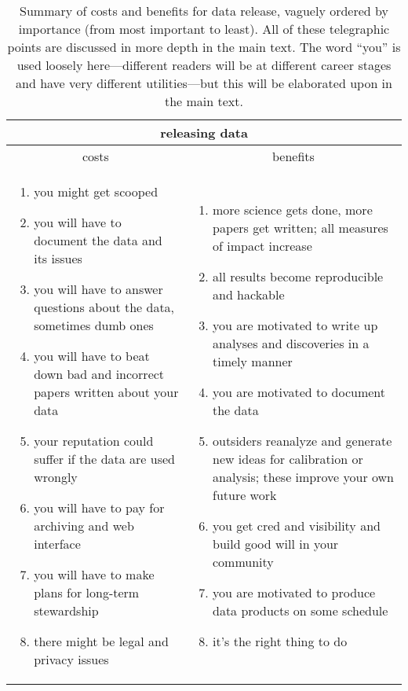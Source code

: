 \documentclass[12pt,twoside,pdftex]{article}
\begin{document}
\newlength{\cwidth}\setlength{\cwidth}{0.483\textwidth}%
\begin{table}%
\begin{tabular}{@{}p{\cwidth}|p{\cwidth}@{}}%
\multicolumn{2}{c}{\textbf{releasing data}} \\ \hline
\multicolumn{1}{c|}{costs} & \multicolumn{1}{c}{benefits} \\ \hline
\begin{enumerate}\raggedright
\item you might get scooped
\item you will have to document the data and its issues
\item you will have to answer questions about the data, sometimes dumb ones
\item you will have to beat down bad and incorrect papers written about your data
\item your reputation could suffer if the data are used wrongly
\item you will have to pay for archiving and web interface
\item you will have to make plans for long-term stewardship
\item there might be legal and privacy issues
\end{enumerate}&\begin{enumerate}\raggedright
\item more science gets done, more papers get written; all measures of impact increase
\item all results become reproducible and hackable
\item you are motivated to write up analyses and discoveries in a timely manner
\item you are motivated to document the data
\item outsiders reanalyze and generate new ideas for calibration or analysis; these improve your own future work
\item you get cred and visibility and build good will in your community
\item you are motivated to produce data products on some schedule
\item it's the right thing to do
\end{enumerate}\end{tabular}
\caption{Summary of costs and benefits for data release, vaguely
  ordered by importance (from most important to least). All of these
  telegraphic points are discussed in more depth in the main text. The
  word ``you'' is used loosely here---different readers will be at
  different career stages and have very different utilities---but this
  will be elaborated upon in the main text.\label{tab:data}}
\end{table}
\end{document}
